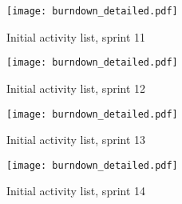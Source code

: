 \begin{figure}[h!]
    \centering
	\texttt{[image: burndown\_detailed.pdf]}
	\caption{Initial activity list, sprint 11}
	\end{figure}

\begin{figure}[h!]
    \centering
	\texttt{[image: burndown\_detailed.pdf]}
	\caption{Initial activity list, sprint 12}
	\end{figure}

\begin{figure}[h!]
    \centering
	\texttt{[image: burndown\_detailed.pdf]}
	\caption{Initial activity list, sprint 13}
	\end{figure}

\begin{figure}[h!]
    \centering
	\texttt{[image: burndown\_detailed.pdf]}
	\caption{Initial activity list, sprint 14}
	\end{figure}
